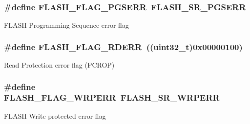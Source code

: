 \subsubsection[{\texorpdfstring{F\+L\+A\+S\+H\+\_\+\+F\+L\+A\+G\+\_\+\+P\+G\+S\+E\+RR}{FLASH_FLAG_PGSERR}}]{\setlength{\rightskip}{0pt plus 5cm}\#define F\+L\+A\+S\+H\+\_\+\+F\+L\+A\+G\+\_\+\+P\+G\+S\+E\+RR~F\+L\+A\+S\+H\+\_\+\+S\+R\+\_\+\+P\+G\+S\+E\+RR}\hypertarget{group___f_l_a_s_h___flag__definition_ga25b80c716320e667162846da8be09b68}{}\label{group___f_l_a_s_h___flag__definition_ga25b80c716320e667162846da8be09b68}
F\+L\+A\+SH Programming Sequence error flag 
\subsubsection[{\texorpdfstring{F\+L\+A\+S\+H\+\_\+\+F\+L\+A\+G\+\_\+\+R\+D\+E\+RR}{FLASH_FLAG_RDERR}}]{\setlength{\rightskip}{0pt plus 5cm}\#define F\+L\+A\+S\+H\+\_\+\+F\+L\+A\+G\+\_\+\+R\+D\+E\+RR~((uint32\+\_\+t)0x00000100)}\hypertarget{group___f_l_a_s_h___flag__definition_ga0d1faec4c7bcca54d543ff3cd8983d3b}{}\label{group___f_l_a_s_h___flag__definition_ga0d1faec4c7bcca54d543ff3cd8983d3b}
Read Protection error flag (P\+C\+R\+OP) 
\subsubsection[{\texorpdfstring{F\+L\+A\+S\+H\+\_\+\+F\+L\+A\+G\+\_\+\+W\+R\+P\+E\+RR}{FLASH_FLAG_WRPERR}}]{\setlength{\rightskip}{0pt plus 5cm}\#define F\+L\+A\+S\+H\+\_\+\+F\+L\+A\+G\+\_\+\+W\+R\+P\+E\+RR~F\+L\+A\+S\+H\+\_\+\+S\+R\+\_\+\+W\+R\+P\+E\+RR}\hypertarget{group___f_l_a_s_h___flag__definition_ga6abf64f916992585899369166db3f266}{}\label{group___f_l_a_s_h___flag__definition_ga6abf64f916992585899369166db3f266}
F\+L\+A\+SH Write protected error flag 